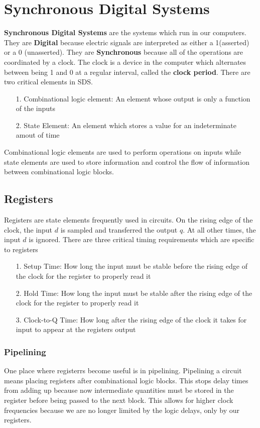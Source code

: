 \documentclass{article}
\begin{document}
\section{Synchronous Digital Systems}
\textbf{Synchronous Digital Systems} are the systems which run in our computers. They are \textbf{Digital} because electric signals are interpreted
as either a 1(asserted) or a 0 (unasserted).
They are \textbf{Synchronous} because all of the operations are coordinated by a clock. The clock is a device in the computer
which alternates between being 1 and 0 at a regular interval, called the \textbf{clock period}. There are two critical elements in SDS.
\begin{itemize}
    \item[1.]Combinational logic element: An element whose output is only a function of the inputs
    \item[2.]State Element: An element which stores a value for an indeterminate amout of time
\end{itemize}
Combinational logic elements are used to perform operations on inputs while state elements are used to store information
and control the flow of information between combinational logic blocks.
\subsection{Registers}
Registers are state elements frequently used in circuits. On the rising edge of the clock, the input $d$ is sampled
and transferred the output $q$. At all other times, the input $d$ is ignored. There are three critical timing requirements
which are specific to registers
\begin{itemize}
    \item[1.]Setup Time: How long the input must be stable before the rising edge of the clock for the register to properly read it
    \item[2.]Hold Time: How long the input must be stable after the rising edge of the clock for the register to properly read it
    \item[3.]Clock-to-Q Time: How long after the rising edge of the clock it takes for input to appear at the registers output  
\end{itemize}
\subsubsection{Pipelining}
One place where registerrs become useful is in pipelining. Pipelining a circuit means
placing registers after combinational logic blocks. This stops delay times from adding up
because now intermediate quantities must be stored in the register before being passed to the next block.
This allows for higher clock frequencies because we are no longer limited by the logic delays, only by our registers.
\end{document}
